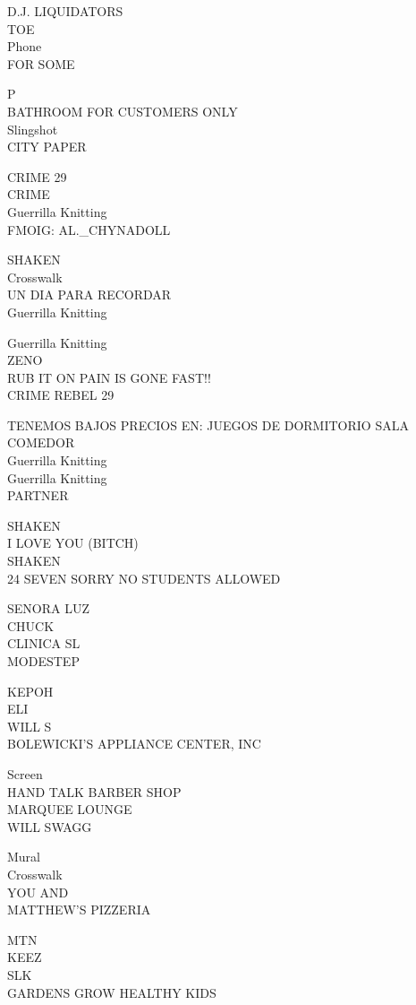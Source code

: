 \documentclass[10pt,letterpaper]{article}
\begin{document}
D.J. LIQUIDATORS\\
TOE\\
Phone\\
FOR SOME

P\\
BATHROOM FOR CUSTOMERS ONLY\\
Slingshot\\
CITY PAPER

CRIME 29\\
CRIME\\
Guerrilla Knitting\\
FMOIG: AL.\_CHYNADOLL

SHAKEN\\
Crosswalk\\
UN DIA PARA RECORDAR\\
Guerrilla Knitting

Guerrilla Knitting\\
ZENO\\
RUB IT ON PAIN IS GONE FAST!!\\
CRIME REBEL 29

TENEMOS BAJOS PRECIOS EN: JUEGOS DE DORMITORIO SALA COMEDOR\\
Guerrilla Knitting\\
Guerrilla Knitting\\
PARTNER

SHAKEN\\
I LOVE YOU (BITCH)\\
SHAKEN\\
24 SEVEN SORRY NO STUDENTS ALLOWED

SENORA LUZ\\
CHUCK\\
CLINICA SL\\
MODESTEP

KEPOH\\
ELI\\
WILL S\\
BOLEWICKI'S APPLIANCE CENTER, INC

Screen\\
HAND TALK BARBER SHOP\\
MARQUEE LOUNGE\\
WILL SWAGG

Mural\\
Crosswalk\\
YOU AND\\
MATTHEW'S PIZZERIA

MTN\\
KEEZ\\
SLK\\
GARDENS GROW HEALTHY KIDS
\end{document}
